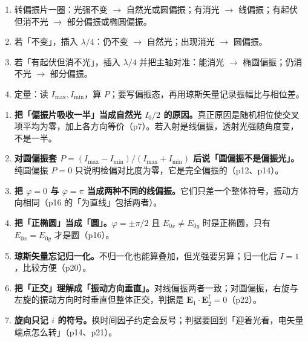 \documentclass[11pt]{ctexart}
\begin{document}

\begin{enumerate}
\item 转偏振片一圈：光强不变 $\to$ 自然光或圆偏振；有消光 $\to$ 线偏振；有起伏但消不光 $\to$ 部分偏振或椭圆偏振。
\item 若「不变」，插入 $\lambda/4$：仍不变 $\to$ 自然光；出现消光 $\to$ 圆偏振。
\item 若「有起伏但消不光」，插入 $\lambda/4$ 并把主轴对准：能消光 $\to$ 椭圆偏振；仍消不光 $\to$ 部分偏振。
\item 定量：读 $I_{\max},I_{\min}$，算 $P$；要写偏振态，再用琼斯矢量记录振幅比与相位差。
\end{enumerate}


\begin{enumerate}
\item \textbf{把「偏振片吸收一半」当成自然光 $I_0/2$ 的原因。}真正原因是随机相位使交叉项平均为零，加上各方向等价（p7）。若入射是线偏振，透射光强随角度变，不是一半。
\item \textbf{对圆偏振套 $P=(I_{\max}-I_{\min})/(I_{\max}+I_{\min})$ 后说「圆偏振不是偏振光」。}纯圆偏振 $P=0$ 只说明检偏对比度为零，它是完全偏振的（p12、p14）。
\item \textbf{把 $\varphi=0$ 与 $\varphi=\pi$ 当成两种不同的线偏振。}它们只差一个整体符号，振动方向相同（p16 的「为直线」包括两者）。
\item \textbf{把「正椭圆」当成「圆」。}$\varphi=\pm\pi/2$ 且 $E_{0x}\neq E_{0y}$ 时是正椭圆，只有 $E_{0x}=E_{0y}$ 才是圆（p16）。
\item \textbf{琼斯矢量忘记归一化。}不归一化也能算叠加，但光强要另算；归一化后 $I=1$，比较方便（p20）。
\item \textbf{把「正交」理解成「振动方向垂直」。}对线偏振两者一致；对圆偏振，右旋与左旋的振动方向时时垂直但整体正交，判据是 $\mathbf{E}_1\cdot\mathbf{E}_2^\dagger=0$（p22）。
\item \textbf{旋向只记 $i$ 的符号。}换时间因子约定会反号；判据要回到「迎着光看，电矢量端点怎么转」（p14、p21）。
\end{enumerate}

\end{document}
